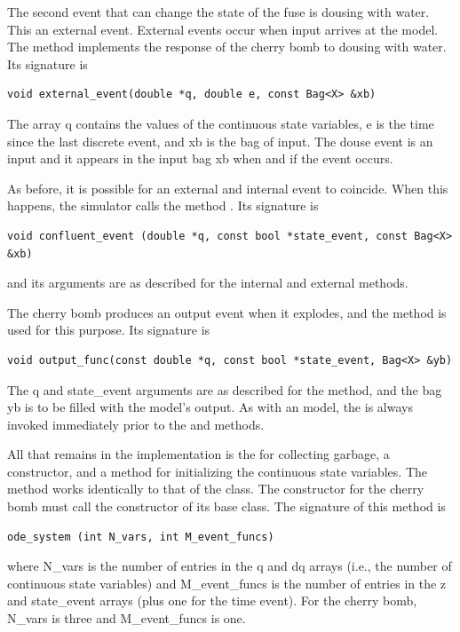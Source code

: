 The second event that can change the state of the fuse is dousing with water. This an external event. External events occur when input arrives at the model. The  method implements the response of the cherry bomb to dousing with water. Its signature is
\begin{verbatim}
void external_event(double *q, double e, const Bag<X> &xb)
\end{verbatim}
The array q contains the values of the continuous state variables, e is the time since the last discrete event, and xb is the bag of input. The douse event is an input and it appears in the input bag xb when and if the event occurs.

As before, it is possible for an external and internal event to coincide. When this happens, the simulator calls the method . Its signature is
\begin{verbatim}
void confluent_event (double *q, const bool *state_event, const Bag<X> &xb)
\end{verbatim}
and its arguments are as described for the internal and external methods.

The cherry bomb produces an output event when it explodes, and the  method is used for this purpose. Its signature is
\begin{verbatim}
void output_func(const double *q, const bool *state_event, Bag<X> &yb)
\end{verbatim}
The q and state\_event arguments are as described for the  method, and the bag yb is to be filled with the model's output. As with an  model, the  is always invoked immediately prior to the  and  methods.

All that remains in the implementation is the  for collecting garbage, a constructor, and a method for initializing the continuous state variables. The  method works identically to that of the  class. The constructor for the cherry bomb must call the constructor of its  base class. The signature of this method is
\begin{verbatim}
ode_system (int N_vars, int M_event_funcs)
\end{verbatim}
where N\_vars is the number of entries in the q and dq arrays (i.e., the number of continuous state variables) and M\_event\_funcs is the number of entries in the z and state\_event arrays (plus one for the time event). For the cherry bomb, N\_vars is three and M\_event\_funcs is one.

